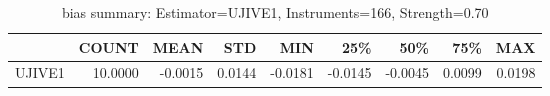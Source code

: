 \begin{table}[ht]
\centering
\caption{bias summary: Estimator=UJIVE1, Instruments=166, Strength=0.70}
\begin{tabular}{lrrrrrrrr}
\toprule
 & COUNT & MEAN & STD & MIN & 25\% & 50\% & 75\% & MAX \\
\midrule
UJIVE1 & 10.0000 & -0.0015 & 0.0144 & -0.0181 & -0.0145 & -0.0045 & 0.0099 & 0.0198 \\
\bottomrule
\end{tabular}
\end{table}
